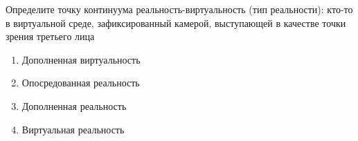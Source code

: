 
Определите точку континуума реальность-виртуальность (тип реальности): кто-то в виртуальной среде, зафиксированный камерой, выступающей в качестве точки зрения третьего лица

\begin{enumerate}
    \item Дополненная виртуальность
    \item Опосредованная реальность
    \item Дополненная реальность
    \item Виртуальная реальность
\end{enumerate}